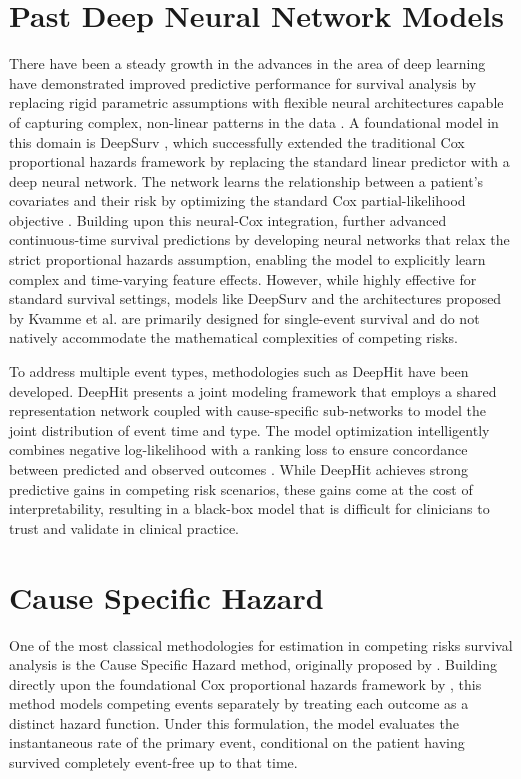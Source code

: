 \documentclass[a4paper,twoside,12pt]{report}
\begin{document}
\section{Past Deep Neural Network Models}
There have been a steady growth in the advances in the area of deep learning have demonstrated improved predictive performance for survival analysis by replacing rigid parametric assumptions with flexible neural architectures capable of capturing complex, non-linear patterns in the data \citep{LeCun2015}. A foundational model in this domain is DeepSurv \citep{Katzman2018}, which successfully extended the traditional Cox proportional hazards framework by replacing the standard linear predictor with a deep neural network. The network learns the relationship between a patient's covariates and their risk by optimizing the standard Cox partial-likelihood objective \citep{Katzman2018}. Building upon this neural-Cox integration,\cite{kvamme2019} further advanced continuous-time survival predictions by developing neural networks that relax the strict proportional hazards assumption, enabling the model to explicitly learn complex and time-varying feature effects. However, while highly effective for standard survival settings, models like DeepSurv and the architectures proposed by Kvamme et al. are primarily designed for single-event survival and do not natively accommodate the mathematical complexities of competing risks.

To address multiple event types, methodologies such as DeepHit \cite{Lee2018} have been developed. DeepHit presents a joint modeling framework that employs a shared representation network coupled with cause-specific sub-networks to model the joint distribution of event time and type. The model optimization intelligently combines negative log-likelihood with a ranking loss to ensure concordance between predicted and observed outcomes \citep{Lee2018}. While DeepHit achieves strong predictive gains in competing risk scenarios, these gains come at the cost of interpretability, resulting in a black-box model that is difficult for clinicians to trust and validate in clinical practice.

\section{Cause Specific Hazard}
One of the most classical methodologies for estimation in competing risks survival analysis is the Cause Specific Hazard method, originally proposed by \citep{prentice1978analysis}. Building directly upon the foundational Cox proportional hazards framework by \cite{Cox1972}, this method models competing events separately by treating each outcome as a distinct hazard function. Under this formulation, the model evaluates the instantaneous rate of the primary event, conditional on the patient having survived completely event-free up to that time. 
\end{document}
